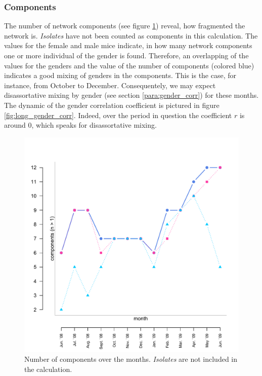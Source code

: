 \subsubsection{Components}

The number of network components (see figure \ref{fig:long_comps}) reveal, how fragmented  the network is. \textit{Isolates} have not been counted as components in this calculation. The values for the female and male mice indicate, in how many network components one or more individual of the gender is found. Therefore, an overlapping of the values for the genders and the value of the number of components (colored blue) indicates a good mixing of genders in the components. This is the case, for instance, from October to December. Consequentely, we may expect disassortative mixing by gender (see section \ref{para:gender_corr}) for these months. The dynamic of the gender correlation coefficient is pictured in figure \ref{fig:long_gender_corr}. Indeed, over the period in question the coefficient $r$ is around 0, which speaks for disassortative mixing.

\begin{figure}[htpb]
\begin{center}
  \includegraphics[width=.6\textwidth]{assets/pdf/long_comps.pdf}
  \caption[Number of components over the months]{Number of components over the months. \textit{Isolates} are not included in the calculation.}
  \label{fig:long_comps}
\end{center}
\end{figure}


% 

